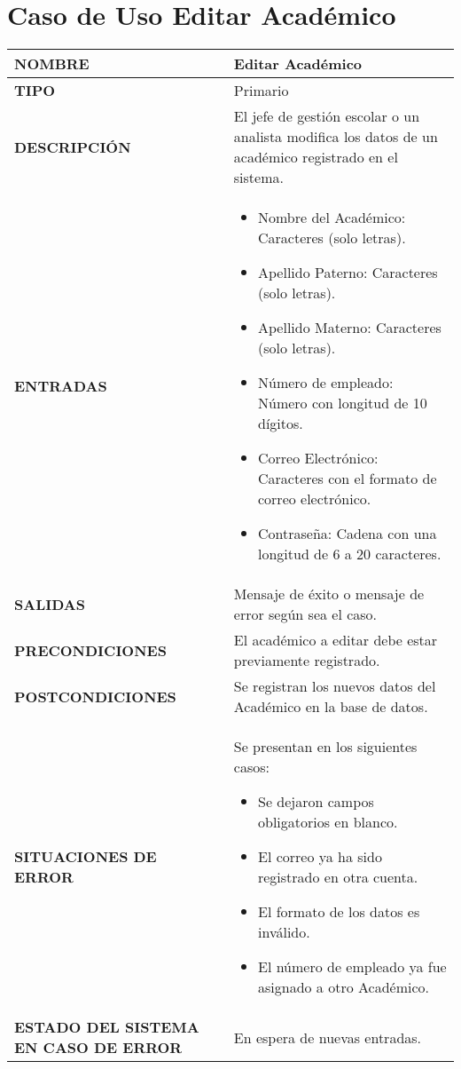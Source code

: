 \newpage
\section{Caso de Uso Editar Académico}
\begin{longtable}{ | p{6cm} | p{10cm} |}
    \hline
    \textbf{NOMBRE} & Editar Académico\\
    \hline
    \textbf{TIPO} & Primario\\
    \hline
    \textbf{DESCRIPCIÓN} & El jefe de gestión escolar o un analista modifica los datos de un académico registrado en el sistema.\\
    \hline
    \textbf{ENTRADAS} &
    \begin{itemize}
    	\item Nombre del Académico: Caracteres (solo letras).
    	\item Apellido Paterno: Caracteres (solo letras).
    	\item Apellido Materno: Caracteres (solo letras).
    	\item Número de empleado: Número con longitud de 10 dígitos.
    	\item Correo Electrónico: Caracteres con el formato de correo electrónico.
    	\item Contraseña: Cadena con una longitud de 6 a 20 caracteres.
    \end{itemize}\\  
    \hline
    \textbf{SALIDAS} & Mensaje de éxito o mensaje de error según sea el caso.\\
    \hline
    \textbf{PRECONDICIONES} & El académico a editar debe estar previamente registrado.\\
    \hline
    \textbf{POSTCONDICIONES} & Se registran los nuevos datos del Académico en la base de datos.\\
    \hline
    \textbf{SITUACIONES DE ERROR} &Se presentan en los siguientes casos:
    \begin{itemize}
    	\item Se dejaron campos obligatorios en blanco.
    	\item El correo ya ha sido registrado en otra cuenta.
    	\item El formato de los datos es inválido.
    	\item El número de empleado ya fue asignado a otro Académico.
    \end{itemize}\\
    \hline
    \textbf{ESTADO DEL SISTEMA EN CASO DE ERROR} &  En espera de nuevas entradas.\\

\end{longtable}
